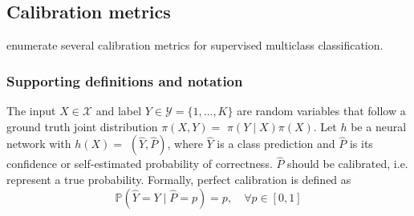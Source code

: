 
\subsection{Calibration metrics}
\cite{guo2017calibration} enumerate several calibration metrics for supervised multiclass classification.

\subsubsection{Supporting definitions and notation}
The input $X \in \mathcal{X}$ and label $Y \in \mathcal{Y}=\{1, \ldots, K\}$ are random variables that follow a ground truth joint distribution $\pi(X, Y)=$ $\pi(Y \mid X) \pi(X)$. Let $h$ be a neural network with $h(X)=$ $(\hat{Y}, \hat{P})$, where $\hat{Y}$ is a class prediction and $\hat{P}$ is its confidence or self-estimated probability of correctness. $\hat{P}$ should be calibrated, i.e. represent a true probability. Formally, perfect calibration is defined as $$\mathbb{P}(\hat{Y}=Y \mid \hat{P}=p)=p, \quad \forall p \in[0,1]$$



